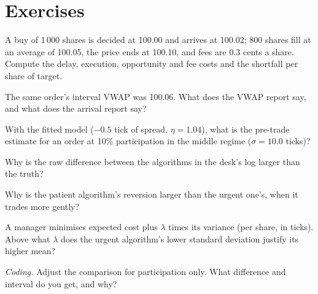 \section{Exercises}

\begin{exercise}[$\star$]\label{exo:mx:transaction-cost-analysis:1}
A buy of 1\,000 shares is decided at 100.00 and arrives at 100.02; 800 shares fill at an average of 100.05, the price ends at 100.10, and fees are 0.3
cents a share. Compute the delay, execution, opportunity and fee costs and the shortfall per share of target.
\end{exercise}

\begin{exercise}[$\star$]\label{exo:mx:transaction-cost-analysis:2}
The same order's interval VWAP was 100.06. What does the VWAP report say, and what does the arrival report say?
\end{exercise}

\begin{exercise}[$\star$]\label{exo:mx:transaction-cost-analysis:3}
With the fitted model ($-0.5$ tick of spread, $\eta=1.04$), what is the pre-trade estimate for an order at 10\% participation in the middle regime
($\sigma=10.0$ ticks)?
\end{exercise}

\begin{exercise}[$\star\star$]\label{exo:mx:transaction-cost-analysis:4}
Why is the raw difference between the algorithms in the desk's log larger than the truth?
\end{exercise}

\begin{exercise}[$\star\star$]\label{exo:mx:transaction-cost-analysis:5}
Why is the patient algorithm's reversion larger than the urgent one's, when it trades more gently?
\end{exercise}

\begin{exercise}[$\star\star$]\label{exo:mx:transaction-cost-analysis:6}
A manager minimises expected cost plus $\lambda$ times its variance (per share, in ticks). Above what $\lambda$ does the urgent algorithm's lower
standard deviation justify its higher mean?
\end{exercise}

\begin{exercise}[$\star\star\star$]\label{exo:mx:transaction-cost-analysis:7}
\emph{Coding.} Adjust the comparison for participation only. What difference and interval do you get, and why?
\end{exercise}

